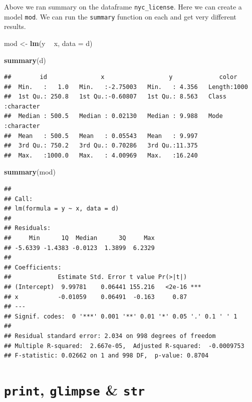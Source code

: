 \documentclass[
]{book}
\newenvironment{Shaded}{\begin{snugshade}}{\end{snugshade}}
\newcommand{\DataTypeTok}[1]{\textcolor[rgb]{0.13,0.29,0.53}{#1}}
\newcommand{\KeywordTok}[1]{\textcolor[rgb]{0.13,0.29,0.53}{\textbf{#1}}}
\newcommand{\NormalTok}[1]{#1}
\newcommand{\OperatorTok}[1]{\textcolor[rgb]{0.81,0.36,0.00}{\textbf{#1}}}
\newcommand{\StringTok}[1]{\textcolor[rgb]{0.31,0.60,0.02}{#1}}
\begin{document}
Above we ran summary on the dataframe \texttt{nyc\_license}. Here we can create a model \texttt{mod}.
We can run the \texttt{summary} function on each and get very different results.

\begin{Shaded}
\begin{Highlighting}[]
\NormalTok{mod <-}\StringTok{ }\KeywordTok{lm}\NormalTok{(y }\OperatorTok{~}\StringTok{ }\NormalTok{x, }\DataTypeTok{data =}\NormalTok{ d)}

\KeywordTok{summary}\NormalTok{(d)}
\end{Highlighting}
\end{Shaded}

\begin{verbatim}
##        id               x                  y             color          
##  Min.   :   1.0   Min.   :-2.75003   Min.   : 4.356   Length:1000       
##  1st Qu.: 250.8   1st Qu.:-0.60807   1st Qu.: 8.563   Class :character  
##  Median : 500.5   Median : 0.02130   Median : 9.988   Mode  :character  
##  Mean   : 500.5   Mean   : 0.05543   Mean   : 9.997                     
##  3rd Qu.: 750.2   3rd Qu.: 0.70286   3rd Qu.:11.375                     
##  Max.   :1000.0   Max.   : 4.00969   Max.   :16.240
\end{verbatim}

\begin{Shaded}
\begin{Highlighting}[]
\KeywordTok{summary}\NormalTok{(mod)}
\end{Highlighting}
\end{Shaded}

\begin{verbatim}
## 
## Call:
## lm(formula = y ~ x, data = d)
## 
## Residuals:
##     Min      1Q  Median      3Q     Max 
## -5.6339 -1.4383 -0.0123  1.3899  6.2329 
## 
## Coefficients:
##             Estimate Std. Error t value Pr(>|t|)    
## (Intercept)  9.99781    0.06441 155.216   <2e-16 ***
## x           -0.01059    0.06491  -0.163     0.87    
## ---
## Signif. codes:  0 '***' 0.001 '**' 0.01 '*' 0.05 '.' 0.1 ' ' 1
## 
## Residual standard error: 2.034 on 998 degrees of freedom
## Multiple R-squared:  2.667e-05,  Adjusted R-squared:  -0.0009753 
## F-statistic: 0.02662 on 1 and 998 DF,  p-value: 0.8704
\end{verbatim}

\hypertarget{print-glimpse-str}{%
\section{\texorpdfstring{\texttt{print}, \texttt{glimpse} \& \texttt{str}}{print, glimpse \& str}}\label{print-glimpse-str}}
\end{document}

